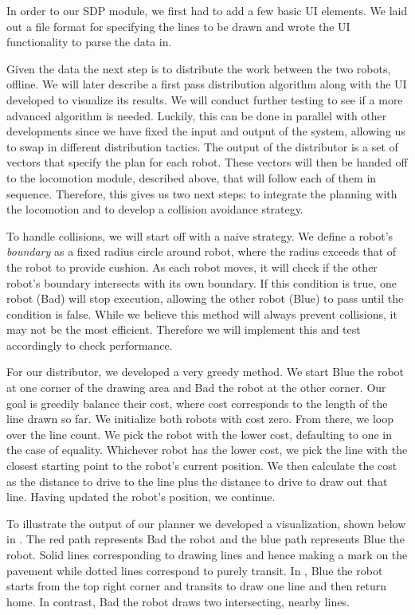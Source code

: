 In order to our SDP module, we first had to add a few basic UI elements. We laid out a file format for specifying the lines to be drawn and wrote the UI functionality to parse the data in.

Given the data the next step is to distribute the work between the two robots, offline. We will later describe a first pass distribution algorithm along with the UI developed to visualize its results. We will conduct further testing to see if a more advanced algorithm is needed. Luckily, this can be done in parallel with other developments since we have fixed the input and output of the system, allowing us to swap in different distribution tactics. The output of the distributor is a set of vectors that specify the plan for each robot. These vectors will then be handed off to the locomotion module, described above, that will follow each of them in sequence. Therefore, this gives us two next steps: to integrate the planning with the locomotion and to develop a collision avoidance strategy. 

To handle collisions, we will start off with a naive strategy. We define a robot's \textit{boundary} as a fixed radius circle around robot, where the radius exceeds that of the robot to provide cushion. As each robot moves, it will check if the other robot's boundary intersects with its own boundary. If this condition is true, one robot (Bad) will stop execution, allowing the other robot (Blue) to pass until the condition is false. While we believe this method will always prevent collisions, it may not be the most efficient. Therefore we will implement this and test accordingly to check performance. 

For our distributor, we developed a very greedy method. We start Blue the robot at one corner of the drawing area and Bad the robot at the other corner. Our goal is greedily balance their cost, where cost corresponds to the length of the line drawn so far. We initialize both robots with cost zero. From there, we loop over the line count. We pick the robot with the lower cost, defaulting to one in the case of equality. Whichever robot has the lower cost, we pick the line with the closest starting point to the robot's current position. We then calculate the cost as the distance to drive to the line plus the distance to drive to draw out that line. Having updated the robot's position, we continue. 

To illustrate the output of our planner we developed a visualization, shown below in . The red path represents Bad the robot and the blue path represents Blue the robot. Solid lines corresponding to drawing lines and hence making a mark on the pavement while dotted lines correspond to purely transit. In , Blue the robot starts from the top right corner and transits to draw one line and then return home. In contrast, Bad the robot draws two intersecting, nearby lines.

